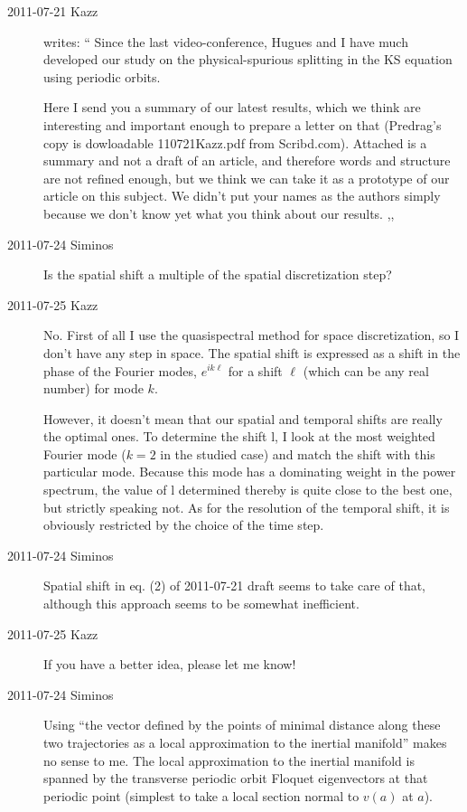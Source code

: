\begin{description}

\item[2011-07-21 Kazz] writes:
``
Since the last video-conference, Hugues and I have much developed our
study on the physical-spurious splitting in the KS equation using
periodic orbits.

Here I send you a summary of our latest results, which we think are
interesting and important enough to prepare a letter on that (Predrag's
copy is dowloadable
{110721Kazz.pdf} from Scribd.com). Attached is a summary and not a draft of
an article, and therefore words and structure are not refined enough, but
we think we can take it as a prototype of our article on this subject. We
didn't put your names as the authors simply because we don't know yet
what you think about our results.
,,

\item[2011-07-24 Siminos]
Is the spatial shift a multiple of the spatial discretization step?

\item[2011-07-25 Kazz]
No. First of all I use the quasispectral method for space discretization,
so I don't have any step in space. The spatial shift is expressed as a
shift in the phase of the Fourier modes, $e^{ik\ell}$ for a shift ${\ell}$ (which
can be any real number) for mode $k$.

However, it doesn't mean that our spatial and temporal shifts are really
the optimal ones. To determine the shift l, I look at the most weighted
Fourier mode ($k=2$ in the studied case) and match the shift with this
particular mode. Because this mode has a dominating weight in the power
spectrum, the value of l determined thereby is quite close to the best
one, but strictly speaking not. As for the resolution of the temporal
shift, it is obviously restricted by the choice of the time step.

\item[2011-07-24 Siminos]
Spatial shift in eq. (2) of 2011-07-21 draft seems to take care
of that, although this approach seems to be somewhat inefficient.

\item[2011-07-25 Kazz]
If you have a better idea, please let me know!

\item[2011-07-24 Siminos]
    Using ``the vector defined by the points of minimal distance along
    these two trajectories as a local approximation to the inertial
    manifold'' makes no sense to me. The local approximation to the
    inertial manifold is spanned by the transverse periodic orbit Floquet
    eigenvectors at that periodic point (simplest to take a local
    \Poincare section normal to $v(a)$ at $a$).


\end{description}
